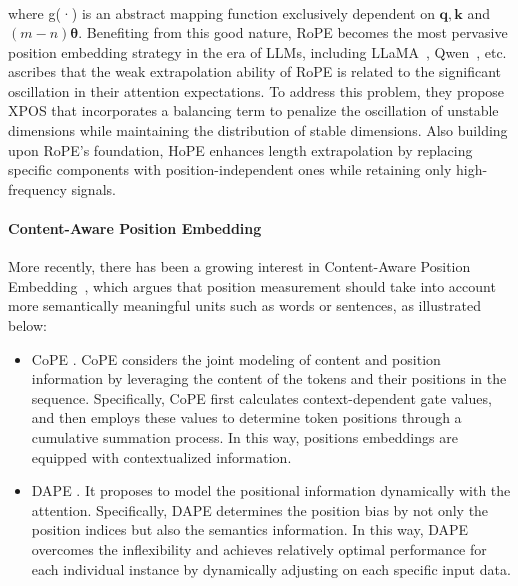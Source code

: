 \documentclass[11pt, a4paper, logo, copyright, nonumbering]{map}
\begin{document}
\begin{itemize}
\begin{align}
\end{align}
where g(·) is an abstract mapping function exclusively dependent on $\mathbf{q},\mathbf{k}$ and $(m-n)\boldsymbol{\theta}$. Benefiting from this good nature, RoPE becomes the most pervasive position embedding strategy in the era of LLMs, including LLaMA~\citep{touvron2023llama},  Qwen~\citep{yang2025qwen2}, etc. \citet{sun2022length} ascribes that the weak extrapolation ability of RoPE is related to the significant oscillation in their attention expectations. To address this problem, they propose XPOS that incorporates a balancing term to penalize the oscillation of unstable dimensions while maintaining the distribution of stable dimensions. Also building upon RoPE's foundation, HoPE \cite{chen2024hope} enhances length extrapolation by replacing specific components with position-independent ones while retaining only high-frequency signals.
\end{itemize}
\paragraph{Content-Aware Position Embedding} More recently, there has been a growing interest in Content-Aware Position Embedding~\cite{golovneva2024contextual,zheng2025dape}, which argues that position measurement should take into account more semantically meaningful units such as words or sentences, as illustrated below:
\begin{itemize}
    \item CoPE \cite{golovneva2024contextual}. CoPE considers the joint modeling of content and position information by leveraging the content of the tokens and their positions in the sequence. Specifically, CoPE first calculates context-dependent gate values, and then employs these values to determine token positions through a cumulative summation process. In this way, positions embeddings are equipped with contextualized information.
    \item DAPE \cite{zheng2025dape,zheng2024dape}. It proposes to model the positional information dynamically with the attention. Specifically, DAPE determines the position bias by not only the position indices but also the semantics information. In this way, DAPE overcomes the inflexibility and achieves relatively optimal performance for each individual instance by dynamically adjusting on each specific input data.
\end{itemize}


   
\end{document}
